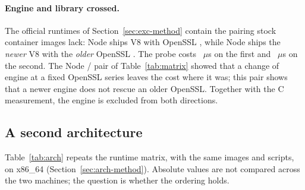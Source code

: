 \documentclass[pdflatex,sn-basic,twocolumn]{sn-jnl}%
\begin{document}
\paragraph{Engine and library crossed.} The official runtimes of
Section~\ref{sec:exc-method} contain the pairing stock container images lack:
Node \RtTwentyTwoLiteral{} ships V8 \RtTwentyTwoVeightFull{} with OpenSSL
\RtTwentyTwoOpenssl, while Node \RtTwentyThreeLiteral{} ships the \emph{newer}
V8 \RtTwentyThreeVeightFull{} with the \emph{older} OpenSSL
\RtTwentyThreeOpenssl. The probe costs \RtTwentyTwoProbe~$\mu$s on the first
and \RtTwentyThreeProbe~$\mu$s on the second. The Node \NodeEighteenNodeMajor/\NodeTwentyNodeMajor{} pair of
Table~\ref{tab:matrix} showed that a change of engine at a fixed OpenSSL series
leaves the cost where it was; this pair shows that a newer engine does not
rescue an older OpenSSL. Together with the C measurement, the engine is
excluded from both directions.

\subsection{A second architecture}\label{sec:rq2-arch}

Table~\ref{tab:arch} repeats the runtime matrix, with the same images and
scripts, on x86\_64 (Section~\ref{sec:arch-method}). Absolute values are not
compared across the two machines; the question is whether the ordering holds.
\end{document}
